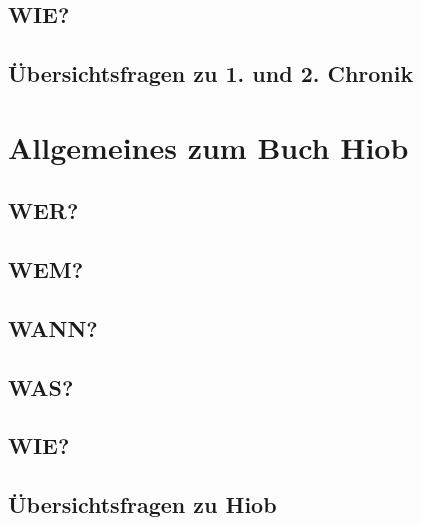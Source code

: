 \subsection{WIE?}
\subsection{Übersichtsfragen zu 1. und 2. Chronik}
    
\section{Allgemeines zum Buch Hiob}
\subsection{WER?}
\subsection{WEM?}
\subsection{WANN?}
\subsection{WAS?}
\subsection{WIE?}
\subsection{Übersichtsfragen zu Hiob}
    



